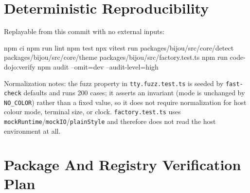\section{Deterministic Reproducibility}\label{record-262-deterministic-reproducibility}

Replayable from this commit with no external inputs:

\begin{CodeBlock}
npm ci
npm run lint
npm test
npx vitest run packages/bijou/src/core/detect packages/bijou/src/core/theme packages/bijou/src/factory.test.ts
npm run code-dojo:verify
npm audit --omit=dev --audit-level=high
\end{CodeBlock}

Normalization notes: the fuzz property in \texttt{t\allowbreak{}t\allowbreak{}y\allowbreak{}.\allowbreak{}f\allowbreak{}u\allowbreak{}z\allowbreak{}z\allowbreak{}.\allowbreak{}t\allowbreak{}e\allowbreak{}s\allowbreak{}t\allowbreak{}.\allowbreak{}t\allowbreak{}s} is seeded by \texttt{f\allowbreak{}a\allowbreak{}s\allowbreak{}t\allowbreak{}-\allowbreak{}c\allowbreak{}h\allowbreak{}e\allowbreak{}c\allowbreak{}k} defaults and runs 200 cases; it asserts an invariant (mode is unchanged by \texttt{N\allowbreak{}O\allowbreak{}\_\allowbreak{}C\allowbreak{}O\allowbreak{}L\allowbreak{}O\allowbreak{}R}) rather than a fixed value, so it does not require normalization for host colour mode, terminal size, or clock. \texttt{f\allowbreak{}a\allowbreak{}c\allowbreak{}t\allowbreak{}o\allowbreak{}r\allowbreak{}y\allowbreak{}.\allowbreak{}t\allowbreak{}e\allowbreak{}s\allowbreak{}t\allowbreak{}.\allowbreak{}t\allowbreak{}s} uses \texttt{m\allowbreak{}o\allowbreak{}c\allowbreak{}k\allowbreak{}R\allowbreak{}u\allowbreak{}n\allowbreak{}t\allowbreak{}i\allowbreak{}m\allowbreak{}e}/\texttt{m\allowbreak{}o\allowbreak{}c\allowbreak{}k\allowbreak{}I\allowbreak{}O}/\texttt{p\allowbreak{}l\allowbreak{}a\allowbreak{}i\allowbreak{}n\allowbreak{}S\allowbreak{}t\allowbreak{}y\allowbreak{}l\allowbreak{}e} and therefore does not read the host environment at all.

\section{Package And Registry Verification Plan}\label{record-262-package-and-registry-verification-plan}

